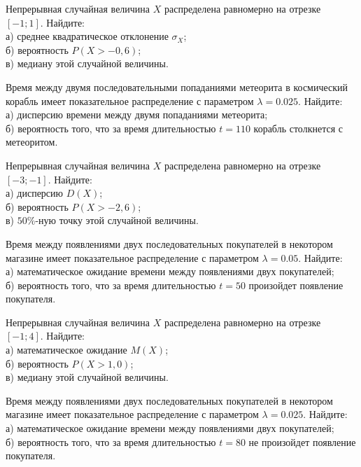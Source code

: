 \vfill

\newpage\setcounter{zad}{0}

\z Непрерывная случайная величина $X$ распределена равномерно на отрезке $[-1; 1]$. Найдите: \\ \quad а) среднее квадратическое отклонение $\sigma_X$; \\ \quad б) вероятность $P(X>-0{,}6)$; \\ \quad в) медиану этой случайной величины.


\vfill

\z Время между двумя последовательными попаданиями метеорита в космический корабль имеет показательное распределение с параметром $\lambda = 0.025$. Найдите: \\ \quad а) дисперсию времени между двумя попаданиями метеорита; \\ \quad б) вероятность того, что за время длительностью $t = 110$ корабль  столкнется с метеоритом.
 

\vfill

\newpage\setcounter{zad}{0}

\z Непрерывная случайная величина $X$ распределена равномерно на отрезке $[-3; -1]$. Найдите: \\ \quad а) дисперсию $D(X)$; \\ \quad б) вероятность $P(X>-2{,}6)$; \\ \quad в) $50\%$-ную точку этой случайной величины.


\vfill

\z Время между появлениями двух последовательных покупателей в некотором магазине имеет показательное распределение с параметром $\lambda = 0.05$. Найдите: \\ \quad а) математическое ожидание времени между появлениями двух покупателей; \\ \quad б) вероятность того, что за время длительностью $t = 50$  произойдет появление покупателя.
 

\vfill

\newpage\setcounter{zad}{0}

\z Непрерывная случайная величина $X$ распределена равномерно на отрезке $[-1; 4]$. Найдите: \\ \quad а) математическое ожидание $M(X)$; \\ \quad б) вероятность $P(X>1{,}0)$; \\ \quad в) медиану этой случайной величины.


\vfill

\z Время между появлениями двух последовательных покупателей в некотором магазине имеет показательное распределение с параметром $\lambda = 0.025$. Найдите: \\ \quad а) математическое ожидание времени между появлениями двух покупателей; \\ \quad б) вероятность того, что за время длительностью $t = 80$ не произойдет появление покупателя.
 

